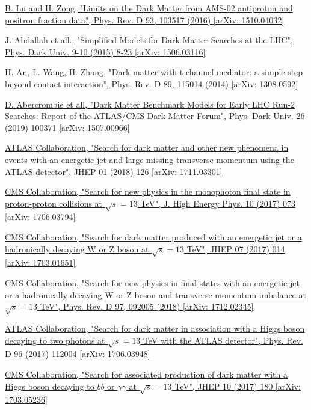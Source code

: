 \documentclass[a4paper, 10pt, openright]{report}
\begin{document}
\begin{thebibliography}{1}
\href{https://arxiv.org/abs/1510.04032}{B. Lu and H. Zong,
"Limits on the Dark Matter from AMS-02 antiproton and positron fraction data",
Phys. Rev. D 93, 103517 (2016) [arXiv: 1510.04032]
}

\href{https://arxiv.org/abs/1506.03116}{J. Abdallah et all.,
"Simplified Models for Dark Matter Searches at the LHC",
Phys. Dark Univ. 9-10 (2015) 8-23 [arXiv: 1506.03116]
}

\href{https://arxiv.org/abs/1308.0592}{H. An, L. Wang, H. Zhang,
"Dark matter with t-channel mediator: a simple step beyond contact interaction",
Phys. Rev. D 89, 115014 (2014) [arXiv: 1308.0592]
}

\href{https://arxiv.org/abs/1507.00966}{D. Abercrombie et all,
"Dark Matter Benchmark Models for Early LHC Run-2 Searches: Report of the ATLAS/CMS Dark Matter Forum", Phys. Dark Univ. 26 (2019) 100371 [arXiv: 1507.00966]}

\href{https://arxiv.org/abs/1711.03301}{ATLAS Collaboration,
"Search for dark matter and other new phenomena in events with an energetic jet and large missing transverse momentum using the ATLAS detector",
JHEP 01 (2018) 126 [arXiv: 1711.03301]
}

\href{https://arxiv.org/abs/1706.03794}{CMS Collaboration,
"Search for new physics in the monophoton final state in proton-proton collisions at $\sqrt{s} = 13$ TeV",
J. High Energy Phys. 10 (2017) 073 [arXiv: 1706.03794]
}

\href{https://arxiv.org/abs/1703.01651}{CMS Collaboration,
"Search for dark matter produced with an energetic jet or a hadronically decaying W or Z boson at $\sqrt{s} = 13$ TeV",
JHEP 07 (2017) 014 [arXiv: 1703.01651]
}

\href{https://arxiv.org/abs/1712.02345}{CMS Collaboration,
"Search for new physics in final states with an energetic jet or a hadronically decaying W or Z boson and transverse momentum imbalance at $\sqrt{s} = 13$ TeV",
Phys. Rev. D 97, 092005 (2018) [arXiv: 1712.02345]
}

\href{https://arxiv.org/abs/1706.03948}{ATLAS Collaboration,
"Search for dark matter in association with a Higgs boson decaying to two photons at $\sqrt{s} = 13$ TeV with the ATLAS detector",
Phys. Rev. D 96 (2017) 112004 [arXiv: 1706.03948]
}

\href{https://arxiv.org/abs/1703.05236}{CMS Collaboration,
"Search for associated production of dark matter with a Higgs boson decaying to $b \bar b$ or $\gamma \gamma$ at $\sqrt{s} = 13$ TeV",
JHEP 10 (2017) 180 [arXiv: 1703.05236]
}


\end{thebibliography}
\end{document}
